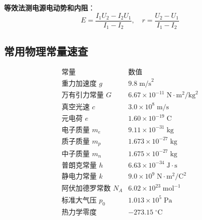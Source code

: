 \textbf{等效法测电源电动势和内阻}：
\[
E = \frac{I_1U_2 - I_2U_1}{I_1 - I_2},\quad
r = \frac{U_2 - U_1}{I_1 - I_2}
\]

\subsection{常用物理常量速查}

\[
\begin{array}{c|c}
\text{常量} & \text{数值} \\ \hline
\text{重力加速度 } g & 9.8\;\text{m/s}^2 \\
\text{万有引力常量 } G & 6.67\times10^{-11}\;\text{N}\cdot\text{m}^2/\text{kg}^2 \\
\text{真空光速 } c & 3.0\times10^8\;\text{m/s} \\
\text{元电荷 } e & 1.60\times10^{-19}\;\text{C} \\
\text{电子质量 } m_e & 9.11\times10^{-31}\;\text{kg} \\
\text{质子质量 } m_p & 1.673\times10^{-27}\;\text{kg} \\
\text{中子质量 } m_n & 1.675\times10^{-27}\;\text{kg} \\
\text{普朗克常量 } h & 6.63\times10^{-34}\;\text{J}\cdot\text{s} \\
\text{静电力常量 } k & 9.0\times10^9\;\text{N}\cdot\text{m}^2/\text{C}^2 \\
\text{阿伏加德罗常数 } N_A & 6.02\times10^{23}\;\text{mol}^{-1} \\
\text{标准大气压 } p_0 & 1.013\times10^5\;\text{Pa} \\
\text{热力学零度} & -273.15\;^\circ\text{C}
\end{array}
\]
